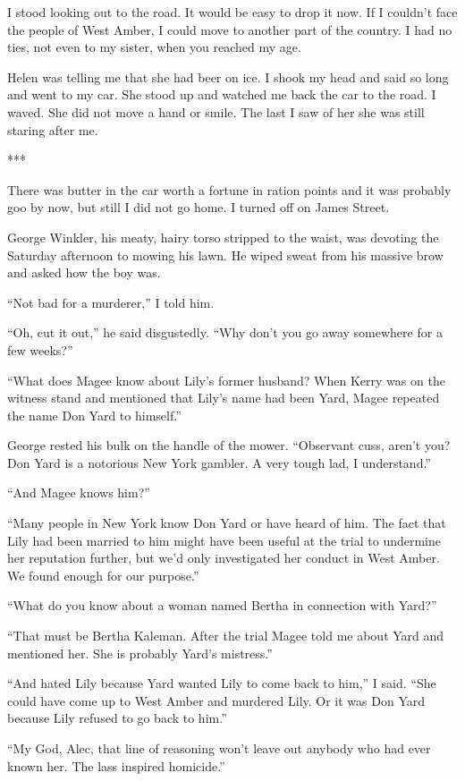 \documentclass{novel}
\begin{document}
I stood looking out to the road. It would be easy to drop it now. If I couldn’t face the people of West Amber, I could move to another part of the country. I had no ties, not even to my sister, when you reached my age.

Helen was telling me that she had beer on ice. I shook my head and said so long and went to my car. She stood up and watched me back the car to the road. I waved. She did not move a hand or smile. The last I saw of her she was still staring after me.

***

There was butter in the car worth a fortune in ration points and it was probably goo by now, but still I did not go home. I turned off on James Street.

George Winkler, his meaty, hairy torso stripped to the waist, was devoting the Saturday afternoon to mowing his lawn. He wiped sweat from his massive brow and asked how the boy was.

“Not bad for a murderer,” I told him.

“Oh, cut it out,” he said disgustedly. “Why don’t you go away somewhere for a few weeks?”

“What does Magee know about Lily’s former husband? When Kerry was on the witness stand and mentioned that Lily’s name had been Yard, Magee repeated the name Don Yard to himself.”

George rested his bulk on the handle of the mower. “Observant cuss, aren’t you? Don Yard is a notorious New York gambler. A very tough lad, I understand.”

“And Magee knows him?”

“Many people in New York know Don Yard or have heard of him. The fact that Lily had been married to him might have been useful at the trial to undermine her reputation further, but we’d only investigated her conduct in West Amber. We found enough for our purpose.”

“What do you know about a woman named Bertha in connection with Yard?”

“That must be Bertha Kaleman. After the trial Magee told me about Yard and mentioned her. She is probably Yard’s mistress.”

“And hated Lily because Yard wanted Lily to come back to him,” I said. “She could have come up to West Amber and murdered Lily. Or it was Don Yard because Lily refused to go back to him.”

“My God, Alec, that line of reasoning won’t leave out anybody who had ever known her. The lass inspired homicide.”
\end{document}
